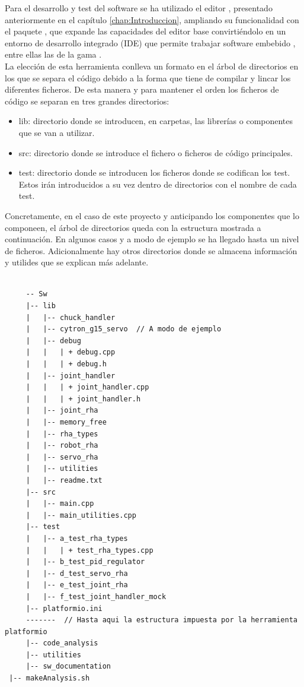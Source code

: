 Para el desarrollo y test del software se ha utilizado el editor , presentado anteriormente en el capítulo \ref{chap:Introduccion}, ampliando su funcionalidad con el paquete , que expande las capacidades del editor base convirtiéndolo en un entorno de desarrollo integrado (IDE) que permite trabajar software embebido , entre ellas las de la gama .
\\

La elección de esta herramienta conlleva un formato en el árbol de directorios en los que se separa el código debido a la forma que tiene de compilar y lincar los diferentes ficheros. De esta manera y para mantener el orden los ficheros de código se separan en tres grandes directorios:

\begin{itemize}
    \item lib: directorio donde se introducen, en carpetas, las librerías o componentes que se van a utilizar.
    \item src: directorio donde se introduce el fichero o ficheros de código principales.
    \item test: directorio donde se introducen los ficheros donde se codifican los test. Estos irán introducidos a su vez dentro de directorios con el nombre de cada test.
\end{itemize}

Concretamente, en el caso de este proyecto y anticipando los componentes que lo componeen, el árbol de directorios queda con la  estructura mostrada a continuación. En algunos casos y a modo de ejemplo se ha llegado hasta un nivel de ficheros. Adicionalmente hay otros directorios donde se almacena información y utilides que se explican más adelante.

\lstset{language=C, breaklines=true, basicstyle=\footnotesize}
    \begin{lstlisting}[frame=single]

	 -- Sw
	 |-- lib
	 |   |-- chuck_handler
	 |   |-- cytron_g15_servo  // A modo de ejemplo
	 |   |-- debug
	 |   |   | + debug.cpp
	 |   |   | + debug.h
	 |   |-- joint_handler
	 |   |   | + joint_handler.cpp
	 |   |   | + joint_handler.h
	 |   |-- joint_rha
	 |   |-- memory_free
	 |   |-- rha_types
	 |   |-- robot_rha
	 |   |-- servo_rha
	 |   |-- utilities
	 |   |-- readme.txt
	 |-- src
	 |   |-- main.cpp
	 |   |-- main_utilities.cpp
	 |-- test
	 |   |-- a_test_rha_types
	 |   |   | + test_rha_types.cpp
	 |   |-- b_test_pid_regulator
	 |   |-- d_test_servo_rha
	 |   |-- e_test_joint_rha
	 |   |-- f_test_joint_handler_mock
	 |-- platformio.ini
	 -------  // Hasta aqui la estructura impuesta por la herramienta platformio
	 |-- code_analysis
	 |-- utilities
	 |-- sw_documentation
 |-- makeAnalysis.sh
    \end{lstlisting}

